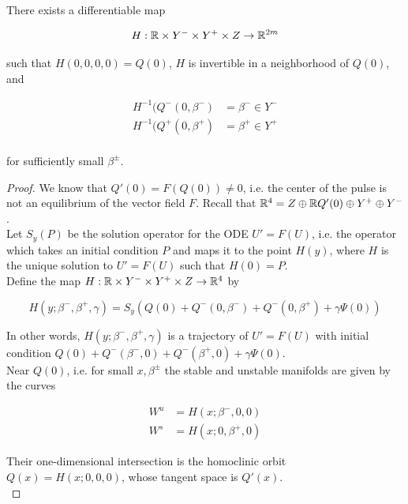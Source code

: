 \documentclass[thesis.tex]{subfiles}
\begin{document}
\begin{lemma}\label{straightenW}

There exists a differentiable map 

\[
H: {\mathbb R} \times Y^- \times Y^+ \times Z \rightarrow {\mathbb R}^{2m}
\]

such that $H(0, 0, 0, 0) = Q(0)$, $H$ is invertible in a neighborhood of $Q(0)$, and

\begin{align*}
H^{-1}(Q^-(0, \beta^-) &= \beta^- \in Y^- \\
H^{-1}(Q^+(0, \beta^+) &= \beta^+ \in Y^+ \\
\end{align*}

for sufficiently small $\beta^\pm$.

\begin{proof}
We know that $Q'(0) = F(Q(0)) \neq 0$, i.e. the center of the pulse is not an equilibrium of the vector field $F$. Recall that ${\mathbb R}^4 = Z \oplus {\mathbb R} Q'(0) \oplus Y^+ \oplus Y^-$.\\

Let $S_y(P)$ be the solution operator for the ODE $U' = F(U)$, i.e. the operator which takes an initial condition $P$ and maps it to the point $H(y)$, where $H$ is the unique solution to $U' = F(U)$ such that $H(0) = P$.\\

Define the map $H: {\mathbb R} \times Y^- \times Y^+ \times Z \rightarrow {\mathbb R}^4$ by 

\begin{equation}
H(y; \beta^-, \beta^+, \gamma) = S_y(Q(0) + Q^-(0, \beta^-) + Q^-(0, \beta^+) + \gamma \Psi(0))
\end{equation}

In other words, $H(y; \beta^-, \beta^+, \gamma)$ is a trajectory of $U' = F(U)$ with initial condition $Q(0) + Q^-(\beta^-,0) + Q^-(\beta^+,0) + \gamma \Psi(0)$.\\ 

Near $Q(0)$, i.e. for small $x, \beta^\pm$ the stable and unstable manifolds are given by the curves

\begin{align*}
W^u &= H(x; \beta^-, 0, 0) \\
W^s &= H(x; 0, \beta^+, 0) 
\end{align*}

Their one-dimensional intersection is the homoclinic orbit $Q(x) = H(x; 0, 0, 0)$, whose tangent space is $Q'(x)$.\\


\end{proof}
\end{lemma}
\end{document}
